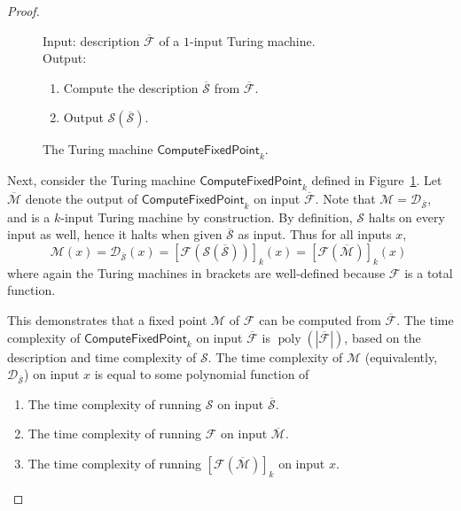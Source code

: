 \documentclass[11pt]{article}
\theoremstyle{definition}
\newcommand{\ol}[1]{\overline{#1}}
\DeclareMathOperator{\poly}{poly}
\renewcommand{\cal}[1]{\mathcal{#1}}
\newcommand{\tmstyle}[1]{\ensuremath{\mathsf{#1}}}
\newcommand{\ComputeFixedPoint}{\tmstyle{ComputeFixedPoint}}
\newenvironment{gamespec}{
  \begin{mdframed}[style=figstyle]}{
  \end{mdframed}}
\begin{document}
\begin{proof}
\begin{figure}[H]
  \centering
  \begin{gamespec}
  	Input: description $\overline{\cal{F}}$ of a $1$-input Turing machine.
    \\[9pt]
    Output:
    \begin{enumerate}
		\item Compute the description $\overline{\cal{S}}$ from
      $\overline{\cal{F}}$.
		\item Output $\cal{S}(\overline{\cal{S}})$.
    \end{enumerate}
  \end{gamespec}
  \caption{The Turing machine $\ComputeFixedPoint_k$.}
  \label{fig:halt_k}
\end{figure}

Next, consider the Turing machine $\ComputeFixedPoint_k$ defined in
Figure~\ref{fig:halt_k}.
Let $\overline{\cal{M}}$ denote the output of $\ComputeFixedPoint_k$ on input
$\overline{\cal{F}}$.
Note that $\cal{M} = \cal{D}_{\overline{\cal{S}}}$, and is a $k$-input Turing
machine by construction.
By definition, $\cal{S}$ halts
on every input as well, hence it halts when given $\overline{\cal{S}}$ as input.
Thus for all inputs $x$,
\begin{equation*}
  \cal{M}(x) = \cal{D}_{\overline{\cal{S}}}(x)
  = \left [
    \cal{F}(\cal{S}(\overline{\cal{S}})) \right ]_k(x)
  = \left [
    \cal{F}(\overline{\cal{M}}) \right ]_k(x)\;
\end{equation*}
where again the Turing machines in brackets are well-defined because $\cal{F}$
is a total function.

This demonstrates that a fixed point $\cal{M}$ of $\cal{F}$ can be computed from
$\overline{\cal{F}}$.
The time complexity of $\ComputeFixedPoint_k$ on input $\ol{\cal{F}}$ is
$\poly(|\ol{\cal{F}}|)$, based on the description and time complexity of
$\cal{S}$.
The time complexity of $\cal{M}$ (equivalently, $\cal{D}_{\overline{\cal{S}}}$)
on input $x$ is equal to some polynomial function of
\begin{enumerate}
\item The time complexity of running $\cal{S}$ on input $\overline{\cal{S}}$.
\item The time complexity of running $\cal{F}$ on input $\overline{\cal{M}}$.
\item The time complexity of running $[\cal{F}(\overline{\cal{M}})]_k$ on input
  $x$.\qedhere
\end{enumerate}
\end{proof}
\end{document}
